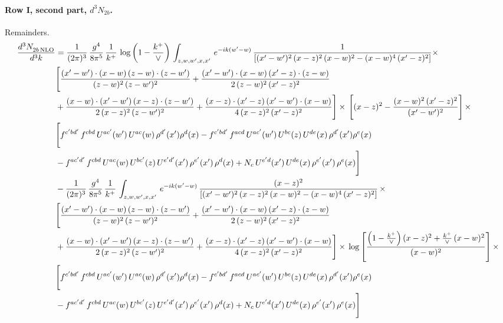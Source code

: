 \documentclass[10pt]{article}
\numberwithin{equation}{section}
\begin{document}
\paragraph{Row I, second part, $d^3N_{2b}$.}
Remainders.
\begin{align}
    \frac{d^{3}N_{2b\,\rm NLO}^{\rm}}{d^{3}k}  & =  \frac{1}{(2\pi)^{3}}\, \frac{g^{4}}{8\pi^{5}}\,\frac{1}{k^{+}}\,\log{\left(1-\frac{k^{+}}{\vee}\right)}\,\int_{z,w,w^{\prime},x,x'}\, e^{-ik(w^{\prime}-w)}\, \frac{1}{\left[(x'-w')^{2}\,(x-z)^{2}\,(x-w)^{2} - (x-w)^{4}\, (x'-z)^{2}\right]} \times\notag \\ & \Bigg[\frac{(x'-w')\cdot (x-w)\, (z-w)\cdot (z-w')}{(z-w)^{2}\, (z-w')^{2}}+\frac{(x'-w')\cdot (x-w)\, (x'-z)\cdot (z-w)}{2\, (z-w)^{2}\, (x'-z)^{2}}\notag \\ & +\frac{(x-w)\cdot (x'-w')\, (x-z)\cdot (z-w')}{2\, (x-z)^{2}\, (z-w')^{2}}+\frac{(x-z)\cdot (x'-z)\, (x'-w')\cdot (x-w)}{4\, (x-z)^{2}\, (x'-z)^{2}}\Bigg] \times\,\Bigg[(x-z)^{2} - \frac{(x-w)^{2}\, (x'-z)^{2}}{(x'-w')^{2}}\Bigg]\,\times \notag \\ & \Bigg[f^{c'bd'}\,f^{cbd}\, U^{ac'}(w')\,U^{ac}(w)\,\rho^{d'}(x')\rho^{d}(x)- f^{c'bd'}\,f^{acd}\,U^{ac'}(w')\,U^{bc}(z)\,U^{de}(x)\,\rho^{d'}(x')\rho^{e}(x) \notag \\ & -f^{ac'd'}\,f^{cbd}\,U^{ac}(w)\,U^{bc'}(z)\,U^{e'd'}(x')\,\rho^{e'}(x')\,\rho^{d}(x) +N_{c}\,U^{e'd}(x')\,U^{de}(x)\,\rho^{e'}(x')\,\rho^{e}(x)\Bigg] \notag \\
&  - \frac{1}{(2\pi)^{3}}\, \frac{g^{4}}{8\pi^{5}}\,\frac{1}{k^{+}}\,\int_{z,w,w^{\prime},x,x'}\, e^{-ik(w^{\prime}-w)}\, \frac{(x-z)^{2}}{\left[(x'-w')^{2}\,(x-z)^{2}\,(x-w)^{2} - (x-w)^{4}\, (x'-z)^{2}\right]}\,  \times\notag \\ & \Bigg[\frac{(x'-w')\cdot (x-w)\, (z-w)\cdot (z-w')}{(z-w)^{2}\, (z-w')^{2}}+\frac{(x'-w')\cdot (x-w)\, (x'-z)\cdot (z-w)}{2\, (z-w)^{2}\, (x'-z)^{2}}\notag \\ & +\frac{(x-w)\cdot (x'-w')\, (x-z)\cdot (z-w')}{2\, (x-z)^{2}\, (z-w')^{2}}+\frac{(x-z)\cdot (x'-z)\, (x'-w')\cdot (x-w)}{4\, (x-z)^{2}\, (x'-z)^{2}}\Bigg] \times\,\log{\left[\frac{\left(1-\frac{k^{+}}{\vee}\right)(x-z)^{2}+\frac{k^{+}}{\vee}\,(x-w)^{2}}{(x-w)^{2}}\right]}\,\times \notag \\ & \Bigg[f^{c'bd'}\,f^{cbd}\, U^{ac'}(w')\,U^{ac}(w)\,\rho^{d'}(x')\rho^{d}(x)- f^{c'bd'}\,f^{acd}\,U^{ac'}(w')\,U^{bc}(z)\,U^{de}(x)\,\rho^{d'}(x')\rho^{e}(x) \notag \\ & -f^{ac'd'}\,f^{cbd}\,U^{ac}(w)\,U^{bc'}(z)\,U^{e'd'}(x')\,\rho^{e'}(x')\,\rho^{d}(x) +N_{c}\,U^{e'd}(x')\,U^{de}(x)\,\rho^{e'}(x')\,\rho^{e}(x)\Bigg] \notag \\

\end{align}
\end{document}
